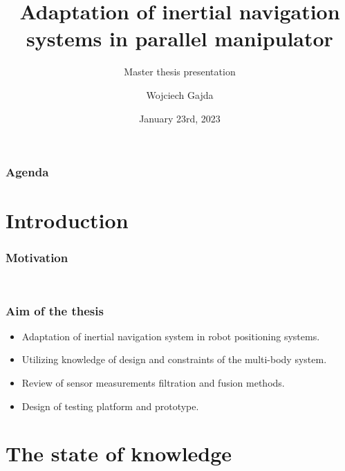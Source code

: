 \documentclass[aspectratio=169]{beamer}
\title{Adaptation of inertial navigation systems in parallel manipulator}
\subtitle{Master thesis presentation}
\author{Wojciech Gajda}
\date{January 23rd, 2023} %
\begin{document}
\sloppy

{
\maketitleframe 
}

\begin{frame}
\frametitle{Agenda}
  \tableofcontents[  
    sectionstyle=show, 
    ]
\end{frame}

\section{Introduction}

\begin{frame}
	\frametitle{Motivation}
	\begin{columns}
		\begin{column}{0.5\textwidth}
			\begin{figure}
				\centering
			\end{figure}
			\vspace{50pt}
		\end{column}
		\begin{column}{0.5\textwidth}
			\begin{figure}
				\centering
			\end{figure}
			\vspace{50pt}
		\end{column}
	\end{columns}
\end{frame}


\begin{frame}
	\frametitle{Aim of the thesis}
	\begin{itemize}
		\setlength\itemsep{1em}
		\item<2-> Adaptation of inertial navigation system in robot positioning systems.
		\item<3-> Utilizing knowledge of design and constraints of the multi-body system.
		\item<4-> Review of sensor measurements filtration and fusion methods.
		\item<5-> Design of testing platform and prototype.
	\end{itemize}
\end{frame}

\section{The state of knowledge}
\end{document}
